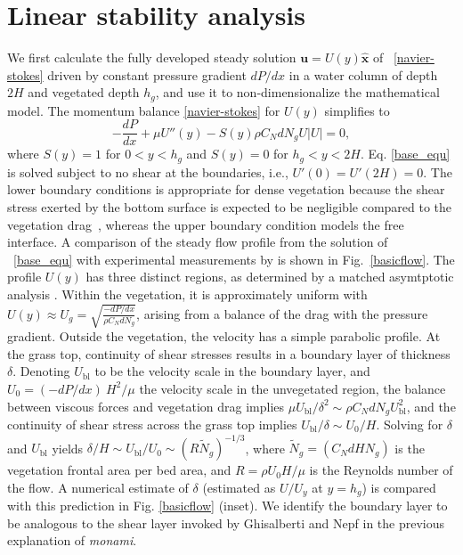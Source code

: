 \documentclass{jfm}
\newcommand{\bu}{\mathbf{u}}
\newcommand{\hg}{h_g}
\renewcommand{\Rey}{{R}}
\newcommand{\Ndg}{\tilde{N}_g}
\newcommand{\monami}{\textit{monami}}
\newcommand{\ubl}{U_\text{bl}}
\newcommand{\ReyNdg}{{\Rey\Ndg}}
\newcommand{\revise}[1]{{{#1}}}
\begin{document}
\section{Linear stability analysis}
We first calculate the fully developed steady solution $\bu = U(y)\boldsymbol{\hat{x}}$ of ~\eqref{navier-stokes} driven by constant pressure gradient $dP/dx$ in a water column of depth $2H$ and vegetated depth $\hg$, and use it to non-dimensionalize the mathematical model. The momentum balance \eqref{navier-stokes} for $U(y)$ simplifies to
\begin{equation}
 -\frac{dP}{dx}+\mu U''(y) -S(y) \rho C_N d N_gU |U|=0,
\label{base_equ}
\end{equation}
where $S(y)=1$ for $0<y<\hg$ and $S(y)=0$ for $\hg< y< 2H$. 
Eq. \eqref{base_equ} is solved subject to no shear at the boundaries, i.e., $U'(0) = U'(2H) = 0$.
The lower boundary conditions is appropriate for dense vegetation because the shear stress exerted by the bottom surface is expected to be negligible compared to the vegetation drag~\citep{Nepf00}, whereas the upper boundary condition models the free interface. 
A comparison of the steady flow profile from the solution of ~\eqref{base_equ} with experimental measurements by \cite{Nepf04} is shown in Fig.~\ref{basicflow}.
The profile $U(y)$ has three distinct regions\revise{, as determined by a matched asymtptotic analysis \citep{Hinch1991}}.
Within the vegetation, it is approximately uniform with $ U(y) \approx U_g = \sqrt{\frac{-dP/dx}{\rho C_N dN_g}}$, arising from a balance of the drag with the pressure gradient. 
Outside the vegetation, the velocity has a simple parabolic profile. %
At the grass top, continuity of shear stresses results in a boundary layer of thickness $\delta$. 
Denoting $\ubl$ to be the velocity scale in the boundary layer, and $U_0 = {(-dP/dx)~H^2}/{\mu}$ the velocity scale in the unvegetated region, the balance between viscous forces and vegetation drag implies $\mu \ubl/\delta^2 \sim \rho C_N d N_g \ubl^2$, and the continuity of shear stress across the grass top implies $\ubl/\delta \sim U_0/H$.
Solving for $\delta$ and $\ubl$ yields $\delta/H \sim \ubl/U_0 \sim (\ReyNdg)^{-1/3}$, where $\Ndg = \left(C_N d H N_g\right)$ is the vegetation frontal area per bed area, and $\Rey=\rho U_0 H/\mu$ is the Reynolds number of the flow. 
A numerical estimate of $\delta$ (estimated as $U/U_y$ at $y=\hg$) is compared with this prediction in Fig. \ref{basicflow} (inset).
We identify the boundary layer to be analogous to the shear layer \revise{invoked} by Ghisalberti and Nepf \citep{Ghisal02,Nepf04} in the previous explanation of \monami.
\end{document}
